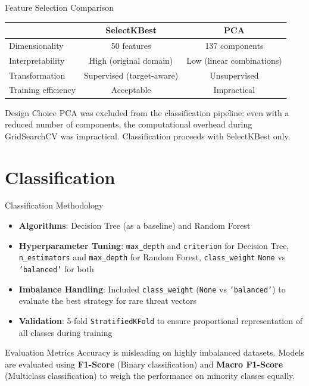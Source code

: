 \documentclass{beamer}
\begin{document}
\begin{frame}{Feature Selection Comparison}
    \small
    \begin{tabular}{lcc}
      \toprule
       & \textbf{SelectKBest} & \textbf{PCA} \\
      \midrule
      Dimensionality & 50 features & 137 components \\
      Interpretability & High (original domain) & Low (linear combinations) \\
      Transformation & Supervised (target-aware) & Unsupervised \\
      Training efficiency & Acceptable & Impractical \\
      \bottomrule
    \end{tabular}
  \vspace{0.3cm}
  \begin{alertblock}{Design Choice}
    PCA was excluded from the classification pipeline: even with a reduced number of
    components, the computational overhead during GridSearchCV was impractical. Classification
    proceeds with SelectKBest only.
  \end{alertblock}
\end{frame}

\section{Classification}

\begin{frame}{Classification Methodology}
  \begin{itemize}
    \item \textbf{Algorithms}: Decision Tree (as a baseline) and Random Forest
    \item \textbf{Hyperparameter Tuning}: \texttt{max\_depth} and \texttt{criterion} for Decision Tree, \texttt{n\_estimators} and \texttt{max\_depth} for Random Forest, \texttt{class\_weight} \texttt{None} vs \texttt{'balanced'} for both
    \item \textbf{Imbalance Handling}: Included \texttt{class\_weight} (\texttt{None} vs \texttt{'balanced'}) to evaluate the best strategy for rare threat vectors
    \item \textbf{Validation}: 5-fold \texttt{StratifiedKFold} to ensure 
      proportional representation of all classes during training
  \end{itemize}
  \vspace{0.2cm}
  \begin{block}{Evaluation Metrics}
    Accuracy is misleading on highly imbalanced datasets. Models are evaluated 
    using \textbf{F1-Score} (Binary classification) and \textbf{Macro F1-Score} 
    (Multiclass classification) to weigh the performance on minority classes equally.
  \end{block}
\end{frame}
\end{document}
